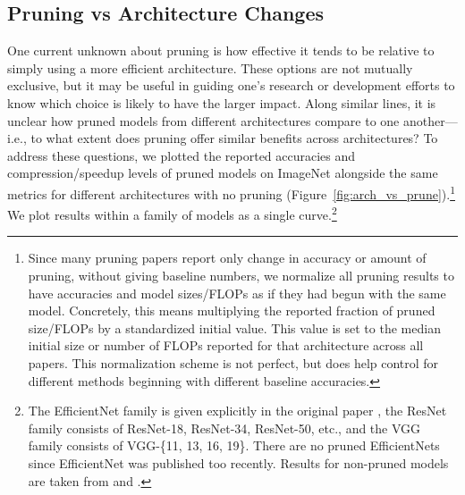 \subsection{Pruning vs Architecture Changes}

One current unknown about pruning is how effective it tends to be relative to simply using a more efficient architecture. These options are not mutually exclusive, but it may be useful in guiding one's research or development efforts to know which choice is likely to have the larger impact. Along similar lines, it is unclear how pruned models from different architectures compare to one another---i.e., to what extent does pruning offer similar benefits across architectures?
To address these questions, we plotted the reported accuracies and compression/speedup levels of pruned models on ImageNet alongside the same metrics for different architectures with no pruning (Figure~\ref{fig:arch_vs_prune}).\footnote{
    Since many pruning papers report only change in accuracy or amount of pruning, without giving baseline numbers, we normalize all pruning results to have accuracies and model sizes/FLOPs as if they had begun with the same model. Concretely, this means multiplying the reported fraction of pruned size/FLOPs by a standardized initial value. This value is set to the median initial size or number of FLOPs reported for that architecture across all papers. This normalization scheme is not perfect, but does help control for different methods beginning with different baseline accuracies.
}
We plot results within a family of models as a single curve.\footnote{
    The EfficientNet family is given explicitly in the original paper \cite{efficientnet}, the ResNet family consists of ResNet-18, ResNet-34, ResNet-50, etc., and the VGG family consists of VGG-\{11, 13, 16, 19\}. There are no pruned EfficientNets since EfficientNet was published too recently. Results for non-pruned models are taken from \cite{efficientnet} and \cite{luigi}.
}

